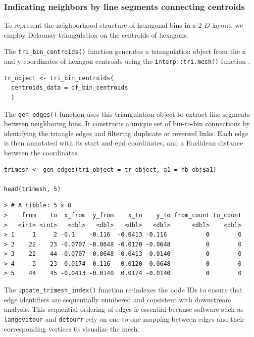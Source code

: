\subsubsection{Indicating neighbors by line segments connecting centroids}\label{indicating-neighbors-by-line-segments-connecting-centroids}

To represent the neighborhood structure of hexagonal bins in a \(2\text{-}D\) layout, we employ Delaunay triangulation \citep{lee1980, albrecht2024} on the centroids of hexagons.

The \texttt{tri\_bin\_centroids()} function generates a triangulation object from the x and y coordinates of hexagon centroids using the \texttt{interp::tri.mesh()} function \citep{albrecht2024}.

\begin{verbatim}
tr_object <- tri_bin_centroids(
  centroids_data = df_bin_centroids
  )
\end{verbatim}

The \texttt{gen\_edges()} function uses this triangulation object to extract line segments between neighboring bins. It constructs a unique set of bin-to-bin connections by identifying the triangle edges and filtering duplicate or reversed links. Each edge is then annotated with its start and end coordinates, and a Euclidean distance between the coordinates.

\begin{verbatim}
trimesh <- gen_edges(tri_object = tr_object, a1 = hb_obj$a1)

head(trimesh, 5)
\end{verbatim}

\begin{verbatim}
> # A tibble: 5 x 8
>    from    to  x_from  y_from    x_to    y_to from_count to_count
>   <int> <int>   <dbl>   <dbl>   <dbl>   <dbl>      <dbl>    <dbl>
> 1     1     2 -0.1    -0.116  -0.0413 -0.116           0        0
> 2    22    23 -0.0707 -0.0648 -0.0120 -0.0648          0        0
> 3    22    44 -0.0707 -0.0648 -0.0413 -0.0140          0        0
> 4     3    23  0.0174 -0.116  -0.0120 -0.0648          0        0
> 5    44    45 -0.0413 -0.0140  0.0174 -0.0140          0        0
\end{verbatim}

The \texttt{update\_trimesh\_index()} function re-indexes the node IDs to ensure that edge identifiers are sequentially numbered and consistent with downstream analysis. This sequential ordering of edges is essential because software such as \texttt{langevitour} and \texttt{detourr} rely on one-to-one mapping between edges and their corresponding vertices to visualize the mesh.

